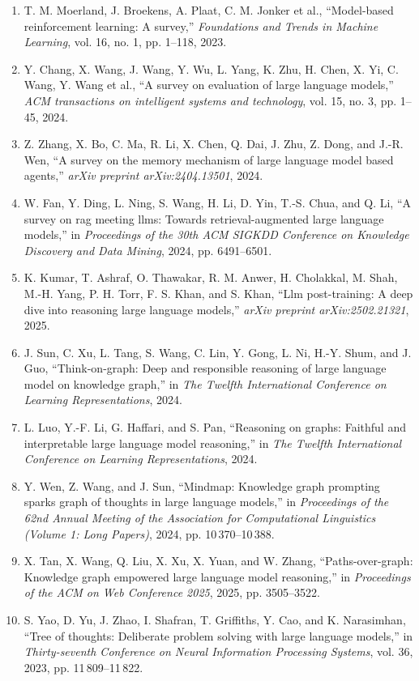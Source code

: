 \documentclass[10pt,UTF8,fontset=fandol]{ctexart}
\begin{document}
\begin{enumerate}[leftmargin=2.4em,labelsep=0.4em,itemsep=0.15em]
\item T. M. Moerland, J. Broekens, A. Plaat, C. M. Jonker et al., ``Model-based reinforcement learning: A survey,'' \textit{Foundations and Trends in Machine Learning}, vol. 16, no. 1, pp. 1--118, 2023.
\item Y. Chang, X. Wang, J. Wang, Y. Wu, L. Yang, K. Zhu, H. Chen, X. Yi, C. Wang, Y. Wang et al., ``A survey on evaluation of large language models,'' \textit{ACM transactions on intelligent systems and technology}, vol. 15, no. 3, pp. 1--45, 2024.
\item Z. Zhang, X. Bo, C. Ma, R. Li, X. Chen, Q. Dai, J. Zhu, Z. Dong, and J.-R. Wen, ``A survey on the memory mechanism of large language model based agents,'' \textit{arXiv preprint arXiv:2404.13501}, 2024.
\item W. Fan, Y. Ding, L. Ning, S. Wang, H. Li, D. Yin, T.-S. Chua, and Q. Li, ``A survey on rag meeting llms: Towards retrieval-augmented large language models,'' in \textit{Proceedings of the 30th ACM SIGKDD Conference on Knowledge Discovery and Data Mining}, 2024, pp. 6491--6501.
\item K. Kumar, T. Ashraf, O. Thawakar, R. M. Anwer, H. Cholakkal, M. Shah, M.-H. Yang, P. H. Torr, F. S. Khan, and S. Khan, ``Llm post-training: A deep dive into reasoning large language models,'' \textit{arXiv preprint arXiv:2502.21321}, 2025.
\item J. Sun, C. Xu, L. Tang, S. Wang, C. Lin, Y. Gong, L. Ni, H.-Y. Shum, and J. Guo, ``Think-on-graph: Deep and responsible reasoning of large language model on knowledge graph,'' in \textit{The Twelfth International Conference on Learning Representations}, 2024.
\item L. Luo, Y.-F. Li, G. Haffari, and S. Pan, ``Reasoning on graphs: Faithful and interpretable large language model reasoning,'' in \textit{The Twelfth International Conference on Learning Representations}, 2024.
\item Y. Wen, Z. Wang, and J. Sun, ``Mindmap: Knowledge graph prompting sparks graph of thoughts in large language models,'' in \textit{Proceedings of the 62nd Annual Meeting of the Association for Computational Linguistics (Volume 1: Long Papers)}, 2024, pp. 10\,370--10\,388.
\item X. Tan, X. Wang, Q. Liu, X. Xu, X. Yuan, and W. Zhang, ``Paths-over-graph: Knowledge graph empowered large language model reasoning,'' in \textit{Proceedings of the ACM on Web Conference 2025}, 2025, pp. 3505--3522.
\item S. Yao, D. Yu, J. Zhao, I. Shafran, T. Griffiths, Y. Cao, and K. Narasimhan, ``Tree of thoughts: Deliberate problem solving with large language models,'' in \textit{Thirty-seventh Conference on Neural Information Processing Systems}, vol. 36, 2023, pp. 11\,809--11\,822.

\end{enumerate}
\end{document}
